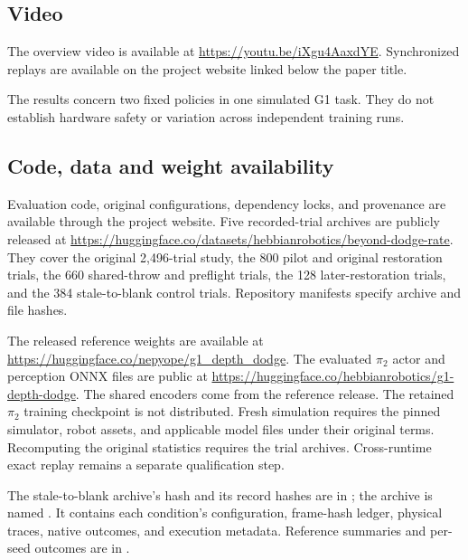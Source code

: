 \subsection{Video}
The overview video is available at \url{https://youtu.be/iXgu4AaxdYE}.
Synchronized replays are available on the project
website linked below the paper title.

The results concern two fixed policies in one simulated G1 task. They do not
establish hardware safety or variation across independent training runs.

\subsection{Code, data and weight availability}
Evaluation code, original configurations, dependency locks, and provenance are
available through the project website. Five recorded-trial archives
are publicly released at
\url{https://huggingface.co/datasets/hebbianrobotics/beyond-dodge-rate}.
They cover the original 2,496-trial study, the 800 pilot and original restoration
trials, the 660 shared-throw and preflight trials, the 128 later-restoration
trials, and the 384 stale-to-blank control trials. Repository manifests specify
archive and file hashes.

The released reference weights are available at
\url{https://huggingface.co/nepyope/g1_depth_dodge}.
The evaluated $\pi_2$ actor and perception ONNX files are public at
\url{https://huggingface.co/hebbianrobotics/g1-depth-dodge}.
The shared encoders come from the reference release. The retained $\pi_2$
training checkpoint is not distributed. Fresh simulation requires the pinned
simulator, robot assets, and applicable model files under their original
terms. Recomputing the original statistics requires the trial archives.
Cross-runtime exact replay remains a separate qualification step.

The stale-to-blank archive's hash and its record hashes are in
; the archive is named
. It contains each condition's configuration,
frame-hash ledger, physical traces, native outcomes, and execution metadata.
Reference summaries and per-seed outcomes are in
.

\clearpage
